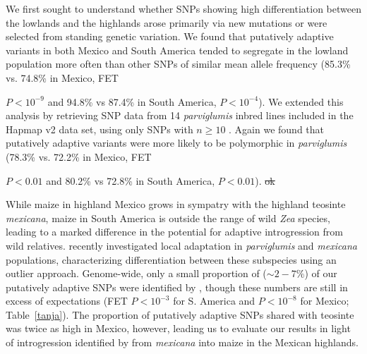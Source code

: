 We first sought to understand whether SNPs showing high differentiation between the lowlands and the highlands arose primarily via new mutations or were selected from standing genetic variation.  
We found that putatively adaptive variants in both Mexico and South America tended to segregate in the lowland population more often than other SNPs of similar mean allele frequency (85.3\% vs. 74.8\% in Mexico, FET {$P < 10^{-9}$ and 94.8\% vs 87.4\% in South America,  $P< 10^{-4}$).  
We extended this analysis by retrieving SNP data from 14 \emph{parviglumis} inbred lines included in the Hapmap v2 data set, using only SNPs with $n\geq10$ \cite[]{Chia_2012_22660545,Hufford_2012_22660546}.  
Again we found that putatively adaptive variants were more likely to be polymorphic in \emph{parviglumis} (78.3\% vs. 72.2\% in Mexico, FET {$P < 0.01$ and 80.2\% vs 72.8\% in South America,  $P< 0.01$).  
\st{ok}

While maize in highland Mexico grows in sympatry with the highland teosinte \textit{mexicana}, maize in South America is outside the range of wild \textit{Zea} species, leading to a marked difference in the potential for adaptive introgression from wild relatives.
\citet{Pyhajarvi2013} recently investigated local adaptation in \textit{parviglumis} and \textit{mexicana} populations, characterizing differentiation between these subspecies using an outlier approach.
Genome-wide, only a small proportion of ($\sim 2-7\%$) of our putatively adaptive SNPs were identified by \citet{Pyhajarvi2013}, though these numbers are still in excess of expectations (FET $P<10^{-3}$ for S. America and $P<10^{-8}$ for Mexico; Table~\ref{tanja}).
The proportion of putatively adaptive SNPs shared with teosinte was twice as high in Mexico, however, leading us to evaluate our results in light of introgression identified by \citet{Profford_2013} from \textit{mexicana} into maize in the Mexican highlands.  


}}
